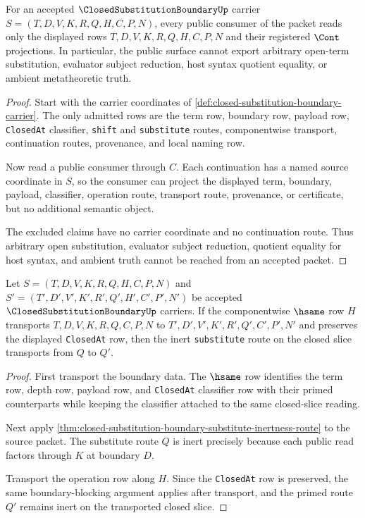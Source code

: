 \begin{theorem}
\label{thm:closed-substitution-boundary-public-nonescape}
For an accepted $\ClosedSubstitutionBoundaryUp$ carrier $S=(T,D,V,K,R,Q,H,C,P,N)$, every public consumer of the packet reads only the displayed rows $T,D,V,K,R,Q,H,C,P,N$ and their registered $\Cont$ projections. In particular, the public surface cannot export arbitrary open-term substitution, evaluator subject reduction, host syntax quotient equality, or ambient metatheoretic truth.
\end{theorem}
\begin{proof}
Start with the carrier coordinates of \autoref{def:closed-substitution-boundary-carrier}. The only admitted rows are the term row, boundary row, payload row, \texttt{ClosedAt} classifier, \texttt{shift} and \texttt{substitute} routes, componentwise transport, continuation routes, provenance, and local naming row.

Now read a public consumer through $C$. Each continuation has a named source coordinate in $S$, so the consumer can project the displayed term, boundary, payload, classifier, operation route, transport route, provenance, or certificate, but no additional semantic object.

The excluded claims have no carrier coordinate and no continuation route. Thus arbitrary open substitution, evaluator subject reduction, quotient equality for host syntax, and ambient truth cannot be reached from an accepted packet.
\end{proof}

\begin{theorem}
\label{thm:closed-substitution-boundary-closed-slice-transport}
Let $S=(T,D,V,K,R,Q,H,C,P,N)$ and $S'=(T',D',V',K',R',Q',H',C',P',N')$ be accepted $\ClosedSubstitutionBoundaryUp$ carriers. If the componentwise $\hsame$ row $H$ transports $T,D,V,K,R,Q,C,P,N$ to $T',D',V',K',R',Q',C',P',N'$ and preserves the displayed \texttt{ClosedAt} row, then the inert \texttt{substitute} route on the closed slice transports from $Q$ to $Q'$.
\end{theorem}
\begin{proof}
First transport the boundary data. The $\hsame$ row identifies the term row, depth row, payload row, and \texttt{ClosedAt} classifier row with their primed counterparts while keeping the classifier attached to the same closed-slice reading.

Next apply \autoref{thm:closed-substitution-boundary-substitute-inertness-route} to the source packet. The substitute route $Q$ is inert precisely because each public read factors through $K$ at boundary $D$.

Transport the operation row along $H$. Since the \texttt{ClosedAt} row is preserved, the same boundary-blocking argument applies after transport, and the primed route $Q'$ remains inert on the transported closed slice.
\end{proof}


